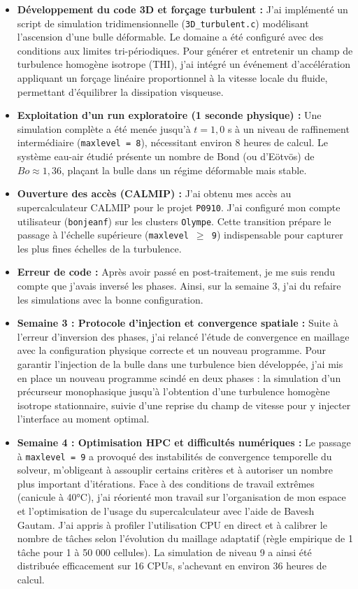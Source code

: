 \begin{itemize}
    \item \textbf{Développement du code 3D et forçage turbulent :} J'ai implémenté un script de simulation tridimensionnelle (\texttt{3D\_turbulent.c}) modélisant l'ascension d'une bulle déformable. Le domaine a été configuré avec des conditions aux limites tri-périodiques. Pour générer et entretenir un champ de turbulence homogène isotrope (THI), j'ai intégré un événement d'accélération appliquant un forçage linéaire proportionnel à la vitesse locale du fluide, permettant d'équilibrer la dissipation visqueuse.
    \item \textbf{Exploitation d'un run exploratoire (1 seconde physique) :} Une simulation complète a été menée jusqu'à $t = 1,0$ s à un niveau de raffinement intermédiaire (\texttt{maxlevel = 8}), nécessitant environ 8 heures de calcul. Le système eau-air étudié présente un nombre de Bond (ou d'Eötvös) de $Bo \approx 1,36$, plaçant la bulle dans un régime déformable mais stable. 
    \item \textbf{Ouverture des accès (CALMIP) :} J'ai obtenu mes accès au supercalculateur CALMIP pour le projet \texttt{P0910}. J'ai configuré mon compte utilisateur (\texttt{bonjeanf}) sur les clusters \texttt{Olympe}. Cette transition prépare le passage à l'échelle supérieure (\texttt{maxlevel $\ge$ 9}) indispensable pour capturer les plus fines échelles de la turbulence.
    \item \textbf{Erreur de code :} Après avoir passé en post-traitement, je me suis rendu compte que j'avais inversé les phases. Ainsi, sur la semaine 3, j'ai du refaire les simulations avec la bonne configuration. 
\item \textbf{Semaine 3 : Protocole d'injection et convergence spatiale :} Suite à l'erreur d'inversion des phases, j'ai relancé l'étude de convergence en maillage avec la configuration physique correcte et un nouveau programme. Pour garantir l'injection de la bulle dans une turbulence bien développée, j'ai mis en place un nouveau programme scindé en deux phases : la simulation d'un précurseur monophasique jusqu'à l'obtention d'une turbulence homogène isotrope stationnaire, suivie d'une reprise du champ de vitesse pour y injecter l'interface au moment optimal.

\item \textbf{Semaine 4 : Optimisation HPC et difficultés numériques :} Le passage à \texttt{maxlevel = 9} a provoqué des instabilités de convergence temporelle du solveur, m'obligeant à assouplir certains critères et à autoriser un nombre plus important d'itérations. Face à des conditions de travail extrêmes (canicule à 40°C), j'ai réorienté mon travail sur l'organisation de mon espace et l'optimisation de l'usage du supercalculateur avec l'aide de Bavesh Gautam. J'ai appris à profiler l'utilisation CPU en direct et à calibrer le nombre de tâches selon l'évolution du maillage adaptatif (règle empirique de 1 tâche pour 1 à 50 000 cellules). La simulation de niveau 9 a ainsi été distribuée efficacement sur 16 CPUs, s'achevant en environ 36 heures de calcul.
    
\end{itemize}